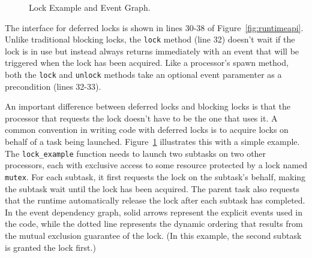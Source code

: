 \begin{figure}
{\begin{tikzpicture}



\end{tikzpicture}
}
\caption{Lock Example and Event Graph.\label{fig:lockevents}}
\vspace{-4mm}
\end{figure}

The interface for deferred locks is shown in lines 30-38 of Figure~\ref{fig:runtimeapi}.
Unlike traditional blocking locks, the {\tt lock} method (line 32) doesn't
wait if the lock is in use but instead always returns immediately with an event that will be triggered
when the lock has been acquired.  Like a processor's spawn method, both the {\tt lock} 
and {\tt unlock} methods take an optional event paramenter as a precondition (lines 32-33).

An important difference between deferred locks and blocking locks is that the processor
that requests the lock doesn't have to be the one that uses it.  A common
convention in writing code with deferred locks is to acquire locks on behalf of a task being
launched.  Figure~\ref{fig:lockevents} illustrates this with a simple example.  The {\tt lock\_example}
function needs to launch two subtasks on two other processors, each with exclusive access to some resource protected by a
lock named {\tt mutex}.  For each subtask, it first requests the lock on the subtask's behalf, making the
subtask wait until the lock has been acquired.  The parent task also requests that the runtime automatically
release the lock after each subtask has completed.  In the event dependency graph, solid arrows represent
the explicit events used in the code, while the dotted line represents the dynamic ordering that results
from the mutual exclusion guarantee of the lock.  (In this example, the second subtask is granted the lock first.)

